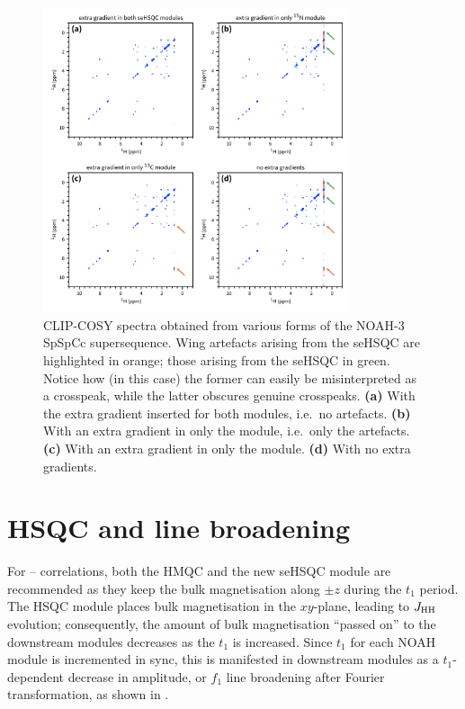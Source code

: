 \begin{figure}
    \centering
    \includegraphics[width=0.8\textwidth]{./figures/wing_artefacts.png}
    \caption{
        CLIP-COSY spectra obtained from various forms of the NOAH-3 SpSpCc supersequence.
        Wing artefacts arising from the \nitrogen{} seHSQC are highlighted in orange; those arising from the \carbon{} seHSQC in green.
        Notice how (in this case) the former can easily be misinterpreted as a crosspeak, while the latter obscures genuine crosspeaks.
        \grami{}
        \textbf{(a)} With the extra gradient inserted for both modules, i.e.\ no artefacts.
        \textbf{(b)} With an extra gradient in only the \nitrogen{} module, i.e.\ only the \carbon{} artefacts.
        \textbf{(c)} With an extra gradient in only the \carbon{} module.
        \textbf{(d)} With no extra gradients.
    }
    \label{fig:wing_artefacts}
\end{figure}


\section{\texorpdfstring{\nitrogen{}}{15N} HSQC and line broadening}

For \nitrogen{}--\proton{} correlations, both the HMQC and the new seHSQC module are recommended as they keep the bulk magnetisation along $\pm z$ during the $t_1$ period.
The HSQC module places bulk magnetisation in the $xy$-plane, leading to $\jhh$ evolution; consequently, the amount of bulk magnetisation ``passed on'' to the downstream modules decreases as the \nitrogen{} $t_1$ is increased.
Since $t_1$ for each NOAH module is incremented in sync, this is manifested in downstream modules as a $t_1$-dependent decrease in amplitude, or $f_1$ line broadening after Fourier transformation, as shown in .

